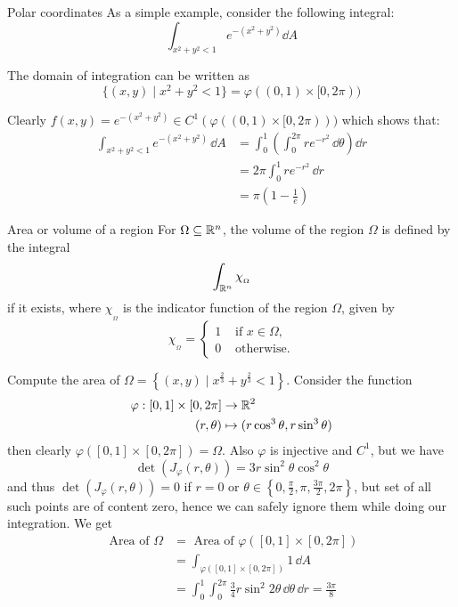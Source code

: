 \documentclass[../Analysis-3.tex]{subfiles}
\begin{document}
\begin{Eg}{Polar coordinates}{}
  As a simple example, consider the following integral:
  \[
    \int_{x^2 + y^2 < 1} e^{-(x^2+y^2)} \dd A
  \]

  The domain of integration can be written as
  \[
    \{ (x,y) \mid x^2 + y^2 < 1 \} = \varphi( (0,1) \times [0,2\pi))
  \]

  Clearly $f(x,y) = e^{-(x^2+y^2)} \in C^1(\varphi((0,1) \times [0,2\pi)))$ which shows that:
  \begin{align*}
    \int_{x^2+y^2 < 1} e^{-(x^2+y^2)} \, \dd A
     & = \int_0^1 \left( \int_0^{2\pi} re^{-r^2} \, \dd \theta \right) \dd r \\
     & = 2\pi \int_0^1 r e^{-r^2} \, \dd r                                   \\
     & = \pi \left( 1 - \frac{1}{e}\right)
  \end{align*}
\end{Eg}

\begin{Def}{Area or volume of a region}{}
  For $\Omega \subseteq \mathbb{R}^n$, the volume of the region $\Omega$ is defined by the integral
  \[
    \int_{\mathbb{R}^n} \chi_{_\Omega}
  \]
  if it exists, where $\chi_{_\Omega}$ is the indicator function of the region $\Omega$, given by
  \[
    \chi_{_\Omega} = \begin{cases}
      1 & \mbox{ if } x \in \Omega, \\
      0 & \mbox{ otherwise}.
    \end{cases}
  \]
  
\end{Def}

\begin{Eg}{}{}
  Compute the area of $\Omega = \left\{ (x,y) \mid x^{\frac{2}{3}} + y^{\frac{2}{3}} < 1 \right\}$. Consider the function
  \begin{align*}
    \varphi : [0,1] \times [0,2\pi] & \to \mathbb{R}^2                                 \\
    (r,\theta)                      & \mapsto ( r\cos^3\theta, r\sin^3\theta )
  \end{align*}
  then clearly $\varphi([0,1] \times [0,2\pi]) = \Omega$. Also $\varphi$ is injective and $C^1$, but we have
  \[
    \det(J_{\varphi}(r,\theta)) = 3r \sin^2\theta \cos^2\theta
  \]
  and thus $\det(J_{\varphi}(r,\theta)) = 0$ if $r = 0$ or $\theta \in \left\{ 0, \frac{\pi}{2}, \pi, \frac{3\pi}{2}, 2\pi \right\}$, but set of all such points are of content zero, hence we can safely ignore them while doing our integration. We get
  \begin{align*}
    \mbox{ Area of } \Omega
     & = \mbox{ Area of } \varphi \left( [0,1] \times [0,2\pi] \right)              \\
     & = \int_{\varphi([0,1] \times [0,2\pi])} 1 \, \dd A                           \\
     & = \int_0^1 \int_0^{2\pi} \frac{3}{4} r \sin^2 2\theta \, \dd \theta \, \dd r = \frac{3\pi}{8}
  \end{align*}
\end{Eg}
\end{document}
